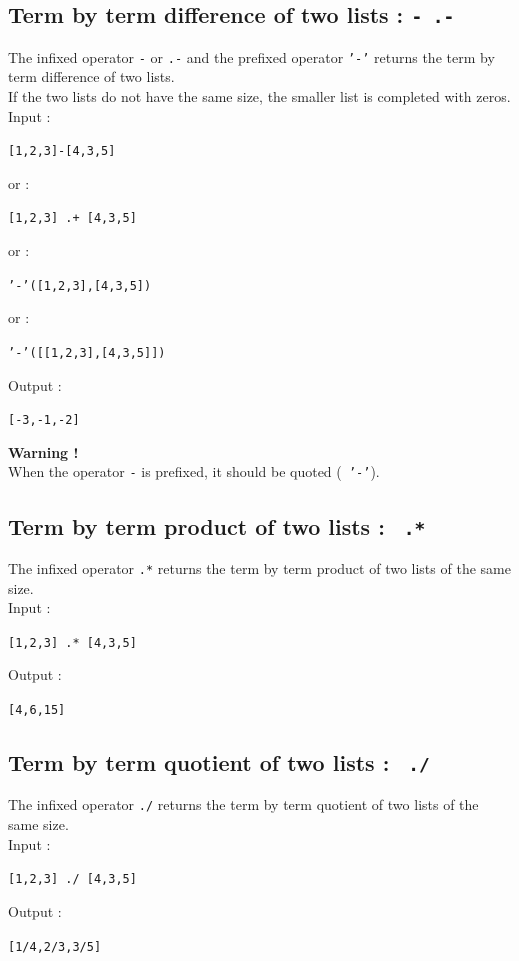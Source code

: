 \documentclass[a4paper,11pt]{book}
\begin{document}
\subsection{Term by term difference of two lists : {\tt -
.-}}
The infixed operator {\tt -} or {\tt .-} and  the prefixed operator 
{\tt '-'} returns the term by term difference of two lists.\\
If the two lists do not have the same size, the smaller list is
completed with
zeros.\\
Input :
\begin{center}{\tt [1,2,3]-[4,3,5]}\end{center}
or :
\begin{center}{\tt [1,2,3] .+ [4,3,5]}\end{center}
or :
\begin{center}{\tt '-'([1,2,3],[4,3,5])}\end{center}
or :
\begin{center}{\tt '-'([[1,2,3],[4,3,5]])}\end{center}
Output :
\begin{center}{\tt [-3,-1,-2]}\end{center}
{\bf Warning !}\\
When the operator {\tt -} is prefixed, it should be quoted ({\tt
'-'}).

\subsection{Term by term product of two lists : {\tt
.*}}
The infixed operator {\tt .*} returns the term by term product of two
lists of 
the same size.\\
Input :
\begin{center}{\tt [1,2,3] .* [4,3,5]}\end{center}
Output :
\begin{center}{\tt [4,6,15]}\end{center}

\subsection{Term by term quotient of two lists : {\tt
./}}
The infixed operator {\tt ./} returns the term by term quotient of two
lists 
of the same size.\\
Input :
\begin{center}{\tt [1,2,3] ./ [4,3,5]}\end{center}
Output :
\begin{center}{\tt [1/4,2/3,3/5]}\end{center}
\end{document}

